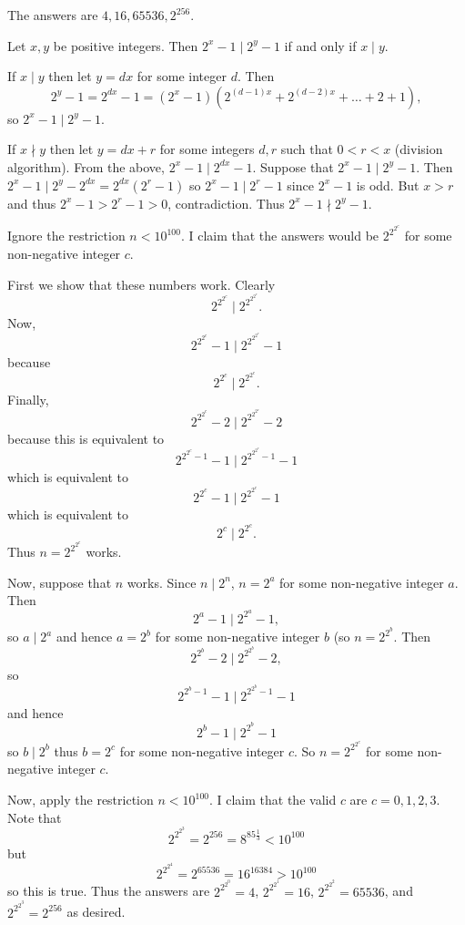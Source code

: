 The answers are $\boxed{4,16,65536,2^{256}}$.

\begin{solutionlemma}
Let $x,y$ be positive integers. Then $2^x-1\mid 2^y-1$ if and only if $x\mid y$.
\end{solutionlemma}
\begin{lemmaproof}
If $x\mid y$ then let $y=dx$ for some integer $d$. Then \[2^y-1=2^{dx}-1=\left(2^x-1\right)\left(2^{\left(d-1\right)x}+2^{\left(d-2\right)x}+\ldots+2+1\right),\] so $2^x-1\mid 2^y-1$.

If $x\nmid y$ then let $y=dx+r$ for some integers $d,r$ such that $0<r<x$ (division algorithm). From the above, $2^x-1\mid2^{dx}-1$. Suppose that $2^x-1\mid2^y-1$. Then $2^x-1\mid2^y-2^{dx}=2^{dx}\left(2^r-1\right)$ so $2^x-1\mid2^r-1$ since $2^x-1$ is odd. But $x>r$ and thus $2^x-1>2^r-1>0$, contradiction. Thus $2^x-1\nmid2^y-1$.
\end{lemmaproof}

Ignore the restriction $n<10^{100}$. I claim that the answers would be $2^{2^{2^c}}$ for some non-negative integer $c$.

First we show that these numbers work. Clearly \[2^{2^{2^c}}\mid2^{2^{2^{2^c}}}.\] Now, \[2^{2^{2^c}}-1\mid2^{2^{2^{2^c}}}-1\] because \[2^{2^c}\mid2^{2^{2^c}}.\] Finally, \[2^{2^{2^c}}-2\mid2^{2^{2^{2^c}}}-2\] because this is equivalent to \[2^{2^{2^c}-1}-1\mid2^{2^{2^{2^c}}-1}-1\] which is equivalent to \[2^{2^c}-1\mid2^{2^{2^c}}-1\] which is equivalent to \[2^c\mid2^{2^c}.\] Thus $n=2^{2^{2^c}}$ works.

Now, suppose that $n$ works. Since $n\mid 2^n$, $n=2^a$ for some non-negative integer $a$. Then \[2^a-1\mid2^{2^a}-1,\] so $a\mid2^a$ and hence $a=2^b$ for some non-negative integer $b$ (so $n=2^{2^b}$. Then \[2^{2^b}-2\mid2^{2^{2^b}}-2,\] so \[2^{2^b-1}-1\mid2^{2^{2^b}-1}-1\] and hence \[2^b-1\mid2^{2^b}-1\] so $b\mid2^b$ thus $b=2^c$ for some non-negative integer $c$. So $n=2^{2^{2^c}}$ for some non-negative integer $c$.

Now, apply the restriction $n<10^{100}$. I claim that the valid $c$ are $c=0,1,2,3$. Note that \[2^{2^{2^3}}=2^{256}=8^{85\frac{1}{3}}<10^{100}\] but \[2^{2^{2^4}}=2^{65536}=16^{16384}>10^{100}\] so this is true. Thus the answers are $2^{2^{2^0}}=4$, $2^{2^{2^1}}=16$, $2^{2^{2^2}}=65536$, and $2^{2^{2^3}}=2^{256}$ as desired.